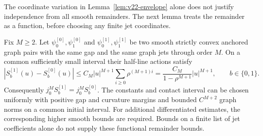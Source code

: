 The coordinate variation in Lemma~\ref{lem:v22-envelope} alone does not
justify independence from all smooth remainders.  The next lemma treats
the remainder as a function, before choosing any finite jet coordinates.

\begin{lemma}
\label{lem:v27-smooth-jet-factorization}
Fix $M\ge2$.  Let $\psi^{[0]}_0,\psi^{[0]}_1$ and
$\psi^{[1]}_0,\psi^{[1]}_1$ be two smooth strictly convex anchored graph
pairs with the same gap and the same graph jets through order $M$.
On a common sufficiently small interval their half-line actions satisfy
\begin{equation}\label{eq:v27-remainder-action-bound}
 |S_b^{[1]}(u)-S_b^{[0]}(u)|
 \le C_M|u|^{M+1}\sum_{i\ge0}\rho^{(M+1)i}
 =\frac{C_M}{1-\rho^{M+1}}|u|^{M+1},\qquad b\in\{0,1\}.
\end{equation}
Consequently $j_0^MS_b^{[1]}=j_0^MS_b^{[0]}$.  The constants and contact
interval can be chosen uniformly with positive gap and curvature margins
and bounded $C^{M+2}$ graph norms on a common initial interval.  For
additional differentiated estimates, the corresponding higher smooth
bounds are required.  Bounds on a finite list of jet coefficients alone
do not supply these functional remainder bounds.
\end{lemma}

